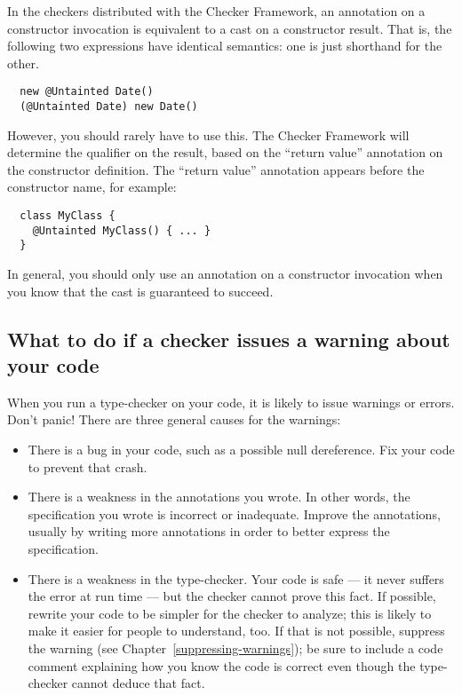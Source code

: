 
In the checkers distributed with the Checker Framework, an annotation on a
constructor invocation is equivalent to a cast on a constructor result.
That is, the following two expressions have identical semantics:  one is
just shorthand for the other.

\begin{Verbatim}
  new @Untainted Date()
  (@Untainted Date) new Date()
\end{Verbatim}

However, you should rarely have to use this.  The Checker Framework will
determine the qualifier on the result, based on the ``return value''
annotation on the constructor definition.  The ``return value'' annotation
appears before the constructor name, for example:

\begin{Verbatim}
  class MyClass {
    @Untainted MyClass() { ... }
  }
\end{Verbatim}

In general, you should only use an annotation on a constructor invocation
when you know that the cast is
guaranteed to succeed.


\subsection{What to do if a checker issues a warning about your code\label{handling-warnings}}

When you run a type-checker on your code, it is likely to issue warnings or
errors.  Don't panic!  There are three general causes for the warnings:

\begin{itemize}
\item
  There is a bug in your code, such as a possible null dereference.  Fix
  your code to prevent that crash.

\item
  There is a weakness in the annotations you wrote.  In other words, the
  specification you wrote is incorrect or inadequate.  Improve the
  annotations, usually by writing more annotations in order to better
  express the specification.

\item
  There is a weakness in the type-checker.  Your code is safe --- it never
  suffers the error at run time --- but the checker cannot prove this fact.
  If possible, rewrite your code to be simpler for the checker to analyze;
  this is likely to make it easier for people to understand, too.
  If that is not possible, suppress the warning (see
  Chapter~\ref{suppressing-warnings}); be sure to include a code
  comment explaining how you know the code is correct even though the
  type-checker cannot deduce that fact.
\end{itemize}

